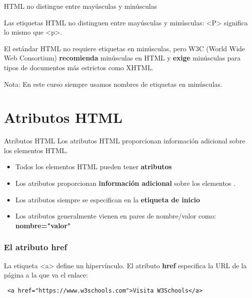 \begin{frame}[c]{HTML no distingue entre mayúsculas y minúsculas}

  Las etiquetas HTML no distinguen entre mayúsculas y minúsculas:
  <P> significa lo mismo que <p>.

  \vspace{\baselineskip}
  El estándar HTML no requiere etiquetas en minúsculas, pero W3C
  (World Wide Web Consortium)
  \textbf{recomienda} minúsculas en HTML y \textbf{exige} minúsculas
  para tipos de documentos más estrictos como XHTML.

  \begin{exampleblock}{Nota:}
    En este curso siempre usamos nombres de etiquetas en minúsculas.
  \end{exampleblock}
\end{frame}

\section{Atributos HTML}

\begin{frame}[c]{Atributos HTML}
  Los atributos HTML proporcionan información adicional
  sobre los elementos HTML.
  \begin{itemize}
    \item Todos los elementos HTML pueden tener \textbf{atributos}
    \item Los atributos proporcionan \textbf{información adicional}
      sobre los elementos .
    \item Los atributos siempre se especifican en la \textbf{etiqueta
      de inicio}
    \item Los atributos generalmente vienen en pares de nombre/valor
      como: \textbf{nombre="valor"}
  \end{itemize}
\end{frame}

\begin{frame}[fragile]
  \frametitle{El atributo href}

  La etiqueta <a> define un hipervínculo.
  El atributo \textbf{href} especifica la URL de la página a la
  que va el enlace:

  \vspace{\baselineskip}
  \begin{lstlisting}
 <a href="https://www.w3schools.com">Visita W3Schools</a>
  \end{lstlisting}
\end{frame}

